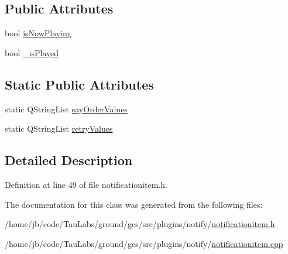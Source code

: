 \subsection*{\-Public \-Attributes}
\begin{DoxyCompactItemize}
\item 
bool \hyperlink{group___notify_plugin_gabd9ee81e318805b60e89e7045eb7deaa}{is\-Now\-Playing}
\item 
bool \hyperlink{group___notify_plugin_ga6469ec28d3051122de855c266d0dc6dd}{\-\_\-is\-Played}
\end{DoxyCompactItemize}
\subsection*{\-Static \-Public \-Attributes}
\begin{DoxyCompactItemize}
\item 
static \-Q\-String\-List \hyperlink{group___notify_plugin_ga856cd4e9d78e6c8900f9de74f0f25dac}{say\-Order\-Values}
\item 
static \-Q\-String\-List \hyperlink{group___notify_plugin_ga7c47e100b3ea3f8b527dbdea2385edd0}{retry\-Values}
\end{DoxyCompactItemize}


\subsection{\-Detailed \-Description}


\-Definition at line 49 of file notificationitem.\-h.



\-The documentation for this class was generated from the following files\-:\begin{DoxyCompactItemize}
\item 
/home/jb/code/\-Tau\-Labs/ground/gcs/src/plugins/notify/\hyperlink{notificationitem_8h}{notificationitem.\-h}\item 
/home/jb/code/\-Tau\-Labs/ground/gcs/src/plugins/notify/\hyperlink{notificationitem_8cpp}{notificationitem.\-cpp}\end{DoxyCompactItemize}
